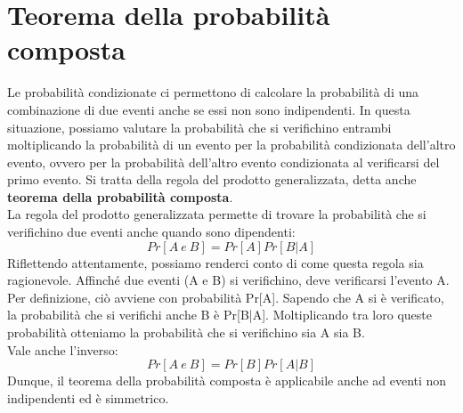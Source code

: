 \documentclass[drafts, 10pt]{book}
\begin{document}
\section{Teorema della probabilità composta}
Le probabilità condizionate ci permettono di calcolare la probabilità di una combinazione di due eventi anche se essi non sono indipendenti. In questa situazione, possiamo valutare la probabilità che si verifichino entrambi moltiplicando la probabilità di un evento per la probabilità condizionata dell'altro evento, ovvero per la probabilità dell'altro evento condizionata al verificarsi del primo evento. Si tratta della regola del prodotto generalizzata, detta anche \textbf{teorema della probabilità composta}. 
\\
La regola del prodotto generalizzata permette di trovare la probabilità che si verifichino due eventi anche quando sono dipendenti: 
\begin{equation}
    Pr[A\ e\ B] = Pr[A] Pr[B|A]
\end{equation}
Riflettendo attentamente, possiamo renderci conto di come questa regola sia ragionevole. Affinché due eventi (A e B) si verifichino, deve verificarsi l'evento A. Per definizione, ciò avviene con probabilità Pr[A]. Sapendo che A si è verificato, la probabilità che si verifichi anche B è Pr[B|A]. Moltiplicando tra loro queste probabilità otteniamo la probabilità che si verifichino sia A sia B.
\\
Vale anche l'inverso:
\begin{equation}
    Pr[A\ e\ B] = Pr[B] Pr[A|B]
\end{equation}
Dunque, il teorema della probabilità composta è applicabile anche ad eventi non indipendenti ed è simmetrico.
\end{document}
